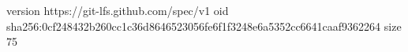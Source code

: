 version https://git-lfs.github.com/spec/v1
oid sha256:0cf248432b260cc1c36d8646523056fe6f1f3248e6a5352cc6641caaf9362264
size 75
